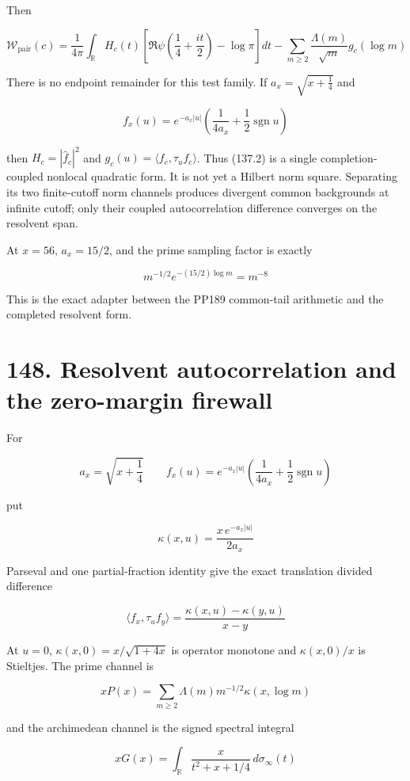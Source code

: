 \documentclass[
  11pt,
]{book}
\begin{document}
Then

\[
\boxed{
\mathcal W_{\mathrm{pair}}(c)=
\frac1{4\pi}\int_{\mathbb R}H_c(t)
\left[\Re\psi\!\left(\frac14+\frac{it}{2}\right)-\log\pi\right]dt
-\sum_{m\ge2}\frac{\Lambda(m)}{\sqrt m}g_c(\log m)}
\tag{137.2}
\]

There is no endpoint remainder for this test family. If
\(a_x=\sqrt{x+\tfrac14}\) and

\[
f_x(u)=e^{-a_x|u|}
\left(\frac1{4a_x}+\frac12\operatorname{sgn}u\right)
\]

then \(H_c=|\widehat f_c|^2\) and
\(g_c(u)=\langle f_c,\tau_uf_c\rangle\). Thus (137.2) is a single
completion-coupled nonlocal quadratic form. It is not yet a Hilbert norm
square. Separating its two finite-cutoff norm channels produces
divergent common backgrounds at infinite cutoff; only their coupled
autocorrelation difference converges on the resolvent span.

At \(x=56\), \(a_x=15/2\), and the prime sampling factor is exactly

\[
m^{-1/2}e^{-(15/2)\log m}=m^{-8}
\tag{137.3}
\]

This is the exact adapter between the PP189 common-tail arithmetic and
the completed resolvent form.

\section{148. Resolvent autocorrelation and the zero-margin
firewall}\label{resolvent-autocorrelation-and-the-zero-margin-firewall}

For

\[
a_x=\sqrt{x+\frac14}
\qquad
f_x(u)=e^{-a_x|u|}
\left(\frac1{4a_x}+\frac12\operatorname{sgn}u\right)
\]

put

\[
\kappa(x,u)=\frac{x\,e^{-a_x|u|}}{2a_x}
\]

Parseval and one partial-fraction identity give the exact translation
divided difference

\[
\boxed{
\langle f_x,\tau_uf_y\rangle
=\frac{\kappa(x,u)-\kappa(y,u)}{x-y}}
\tag{148.1}
\]

At \(u=0\), \(\kappa(x,0)=x/\sqrt{1+4x}\) is operator monotone and
\(\kappa(x,0)/x\) is Stieltjes. The prime channel is

\[
\boxed{
xP(x)=\sum_{m\ge2}
\Lambda(m)m^{-1/2}\kappa(x,\log m)}
\tag{148.2}
\]

and the archimedean channel is the signed spectral integral

\[
\boxed{
xG(x)=\int_{\mathbb R}
\frac{x}{t^2+x+1/4}\,d\sigma_\infty(t)}
\tag{148.3}
\]
\end{document}
